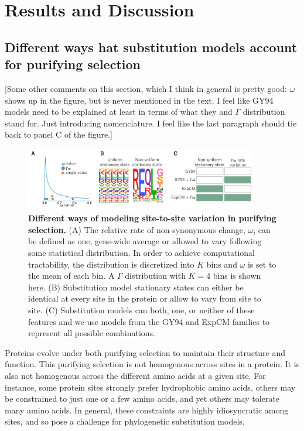 \documentclass[11pt]{article}
\newcommand\jdbcomment[1]{{\color{red}[#1]}}
\begin{document}
\section*{Results and Discussion}

\subsection*{Different ways hat substitution models account for purifying selection}

\jdbcomment{Some other comments on this section, which I think in general is pretty good: $\omega$ shows up in the figure, but is never mentioned in the text. I feel like GY94 models need to be explained at least in terms of what they and $\Gamma$ distribution stand for. Just introducing nomenclature. I feel like the last paragraph should tie back to panel C of the figure.}

\begin{figure}[H]
\centerline{\includegraphics[width=0.90\textwidth]{figures/model_feature.pdf}}
\caption{\label{fig:model_feature}
\textbf{Different ways of modeling site-to-site variation in purifying selection.}
(A) The relative rate of non-synonymous change, $\omega$, can be defined as one, gene-wide average or allowed to vary following some statistical distribution.
In order to achieve computational tractability, the distribution is discretized into $K$ bins and $\omega$ is set to the mean of each bin. 
A $\Gamma$ distribution with $K=4$ bins is shown here. 
(B) Substitution model stationary states can either be identical at every site in the protein or allow to vary from site to site. 
(C) Substitution models can both, one, or neither of these features and we use models from the GY94 and ExpCM families to represent all possible combinations. 
}
\end{figure}

Proteins evolve under both purifying selection to maintain their structure and function. 
This purifying selection is not homogenous across sites in a protein.
It is also not homogenous across the different amino acids at a given site.
For instance, some protein sites strongly prefer hydrophobic amino acids, others may be constrained to just one or a few amino acids, and yet others may tolerate many amino acids.
In general, these constraints are highly idiosyncratic among sites, and so pose a challenge for phylogenetic substitution models.
\end{document}
